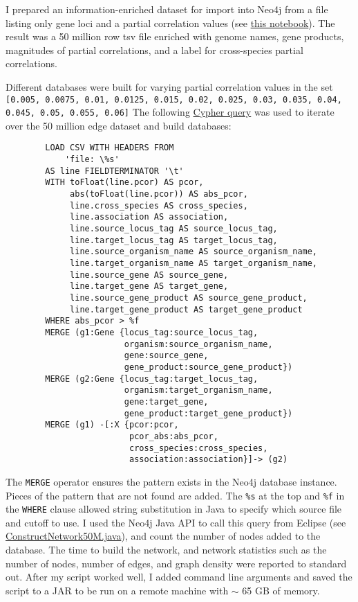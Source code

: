 \documentclass[12pt]{article}
\begin{document}
I prepared an information-enriched dataset for import into Neo4j from a file listing only gene loci and a partial correlation values (see \href{https://github.com/JanetMatsen/Neo4j_meta4/blob/master/jupyter/prepare_whole_network.ipynb}{this notebook}).  
The result was a 50 million row tsv file enriched with genome names, gene products, magnitudes of partial correlations, and a label for cross-species partial correlations.

Different databases were built for varying partial correlation values in the set \texttt{[0.005,  0.0075,  0.01,  0.0125,  0.015,  0.02,  0.025,  0.03,  0.035,  0.04,  0.045,  0.05,  0.055,  0.06]}
The following \href{https://github.com/JanetMatsen/Neo4j_meta4/blob/master/data_mining_Neo4j_v2_3_2/queries/load_network--specify_cutoff.txt}{Cypher query} was used to iterate over the 50 million edge dataset and build databases:

\begin{verbatim}
        LOAD CSV WITH HEADERS FROM
            'file: \%s'
        AS line FIELDTERMINATOR '\t'
        WITH toFloat(line.pcor) AS pcor,
             abs(toFloat(line.pcor)) AS abs_pcor,
             line.cross_species AS cross_species,
             line.association AS association,
             line.source_locus_tag AS source_locus_tag,
             line.target_locus_tag AS target_locus_tag,
             line.source_organism_name AS source_organism_name,
             line.target_organism_name AS target_organism_name,
             line.source_gene AS source_gene,
             line.target_gene AS target_gene,
             line.source_gene_product AS source_gene_product,
             line.target_gene_product AS target_gene_product
        WHERE abs_pcor > %f
        MERGE (g1:Gene {locus_tag:source_locus_tag,
                        organism:source_organism_name,
                        gene:source_gene,
                        gene_product:source_gene_product})
        MERGE (g2:Gene {locus_tag:target_locus_tag,
                        organism:target_organism_name,
                        gene:target_gene,
                        gene_product:target_gene_product})
        MERGE (g1) -[:X {pcor:pcor,
                         pcor_abs:abs_pcor,
                         cross_species:cross_species,
                         association:association}]-> (g2)
\end{verbatim}

The \texttt{MERGE} operator ensures the pattern exists in the Neo4j database instance.
Pieces of the pattern that are not found are added. 
The \texttt{\%s} at the top and \texttt{\%f} in the \texttt{WHERE} clause allowed string substitution in Java to specify which source file and cutoff to use. 
I used the Neo4j Java API to call this query from Eclipse (see \href{https://github.com/JanetMatsen/Neo4j_meta4/blob/master/data_mining_Neo4j_v2_3_2/src/ConstructNetwork50M.java}{ConstructNetwork50M.java}), and count the number of nodes added to the database. 
The time to build the network, and network statistics such as the number of nodes, number of edges, and graph density were reported to standard out.
After my script worked well, I added command line arguments and saved the script to a JAR to be run on a remote machine with $\sim$ 65 GB of memory.
\end{document}
